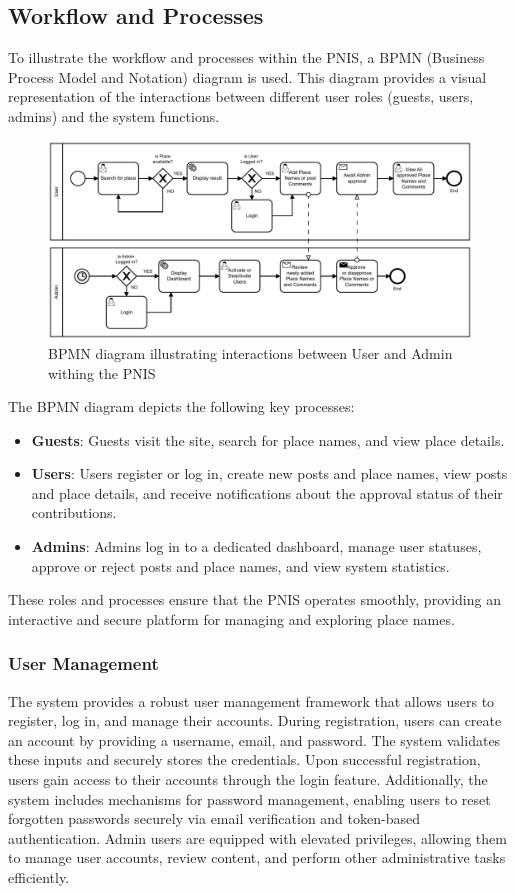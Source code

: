 \subsection{Workflow and Processes}
To illustrate the workflow and processes within the PNIS, a BPMN (Business Process Model and Notation) diagram is used. This diagram provides a visual representation of the interactions between different user roles (guests, users, admins) and the system functions.
\begin{figure}[htb]
    \centering
    \includegraphics[width=.9\textwidth, keepaspectratio]{process_1}
    \caption{BPMN diagram illustrating interactions between User and Admin withing the PNIS}
    \label{fig:bpmn}
\end{figure}

The BPMN diagram depicts the following key processes:
\begin{itemize}
    \item \textbf{Guests}: Guests visit the site, search for place names, and view place details.
    \item \textbf{Users}: Users register or log in, create new posts and place names, view posts and place details, and receive notifications about the approval status of their contributions.
    \item \textbf{Admins}: Admins log in to a dedicated dashboard, manage user statuses, approve or reject posts and place names, and view system statistics.
\end{itemize}

These roles and processes ensure that the PNIS operates smoothly, providing an interactive and secure platform for managing and exploring place names.
\subsubsection{User Management}
The system provides a robust user management framework that allows users to register, log in, and manage their accounts. During registration, users can create an account by providing a username, email, and password. The system validates these inputs and securely stores the credentials. Upon successful registration, users gain access to their accounts through the login feature. Additionally, the system includes mechanisms for password management, enabling users to reset forgotten passwords securely via email verification and token-based authentication. Admin users are equipped with elevated privileges, allowing them to manage user accounts, review content, and perform other administrative tasks efficiently.

